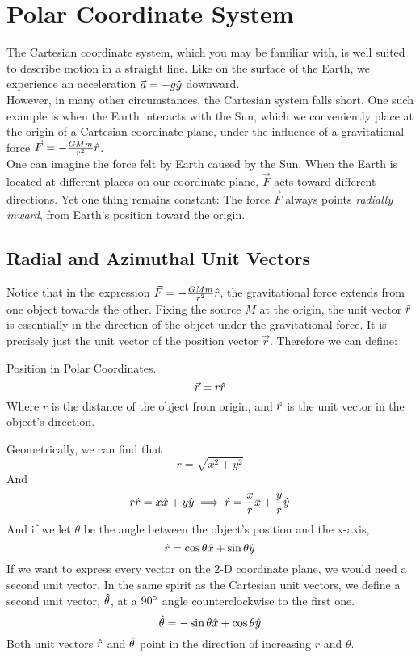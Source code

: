 \documentclass[11pt]{article}
\theoremstyle{gangnamstyle}{\newtheorem{definition}{Definition}[]}
\theoremstyle{gangnamstyle}{\newtheorem{example}{Example}[]}
\theoremstyle{gangnamstyle}{\newtheorem{problem}{Problem}[]}
\begin{document}
\section{Polar Coordinate System}

The Cartesian coordinate system, which you may be familiar with, is well suited to describe motion in a straight line. Like on the surface of the Earth, we experience an acceleration $\Vec{a} = -g\Hat{y}$ downward. \\ 
However, in many other circumstances, the Cartesian system falls short. One such example is when the Earth interacts with the Sun, which we conveniently place at the origin of a Cartesian coordinate plane, under the influence of a gravitational force $\Vec{F} = -\frac{GMm}{r^2} \Hat{r}$. \\
One can imagine the force felt by Earth caused by the Sun. When the Earth is located at different places on our coordinate plane, $\Vec{F}$ acts toward different directions. Yet one thing remains constant: The force $\Vec{F}$ always points \textit{radially inward}, from Earth's position toward the origin. 

\subsection{Radial and Azimuthal Unit Vectors}

Notice that in the expression $\Vec{F} = -\frac{GMm}{r^2} \Hat{r}$, the gravitational force extends from one object towards the other. Fixing the source $M$ at the origin, the unit vector $\Hat{r}$ is essentially in the direction of the object under the gravitational force. It is precisely just the unit vector of the position vector $\Vec{r}$. Therefore we can define: 

\begin{definition}
Position in Polar Coordinates. \\
\begin{equation}
\Vec{r} = r \Hat{r}
\end{equation}
Where $r$ is the distance of the object from origin, and $\Hat{r}$ is the unit vector in the object's direction. 
\end{definition}

Geometrically, we can find that 
\[ r = \sqrt{x^2 + y^2} \]
And
\[ r\Hat{r} = x\Hat{x} + y\Hat{y} \implies \Hat{r} = \frac{x}{r}\Hat{x} + \frac{y}{r}\Hat{y} \]
And if we let $\theta$ be the angle between the object's position and the x-axis, 
\[ \Hat{r} = \cos\theta\Hat{x} + \sin\theta\Hat{y} \]
If we want to express every vector on the 2-D coordinate plane, we would need a second unit vector. In the same spirit as the Cartesian unit vectors, we define a second unit vector, $\Hat{\theta}$, at a $90 \degree$ angle counterclockwise to the first one. 
\[ \Hat{\theta} = -\sin\theta\Hat{x} + \cos\theta\Hat{y} \]
Both unit vectors $\Hat{r}$ and $\Hat{\theta}$ point in the direction of increasing $r$ and $\theta$. 
\end{document}
